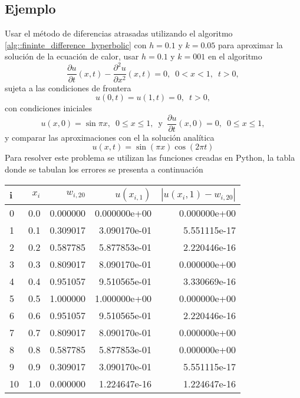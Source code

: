 \documentclass[a4paper]{article}
\begin{document}
\subsection{Ejemplo}
Usar el método de diferencias atrasadas utilizando el algoritmo \ref{alg::fininte_difference_hyperbolic} con $h=0.1$ y $k=0.05$ para aproximar la solución de la ecuación de calor, usar $h=0.1$ y $k=001$ en el algoritmo
\begin{equation}
\frac{\partial u}{\partial t}(x,t) -\frac{\partial^2 u}{\partial x ^2}(x,t)=0, \,\,\, 0<x<1,\,\,\, t>0,
\end{equation}
sujeta a las condiciones de frontera
\begin{equation*}
u(0,t)=u(1,t)=0,\,\,\, t>0,
\end{equation*}
con condiciones iniciales
\begin{equation}
u(x,0)=\sin{\pi x},\,\,\, 0\leq x \leq 1,\,\,\,\text{y}\,\,\,\frac{\partial u}{\partial t}(x,0)=0,\,\,\, 0\leq x \leq 1,
\end{equation}
y comparar las aproximaciones con el la solución analítica
\begin{equation}
u(x,t)=\sin{(\pi x)}\cos{(2\pi t)}
\end{equation}
Para  resolver este problema se utilizan las funciones creadas en Python, la tabla donde se tabulan los errores se presenta a continuación\\
\begin{tabular}{lrrrr}
\toprule
i &  $x_i$ &    $w_{i,20}$ &      $u(x_{i,1})$ &  $|u(x{_i,1})-w_{i,20}|$ \\
\midrule
0  &  0.0 &  0.000000 &  0.000000e+00 &       0.000000e+00 \\
1  &  0.1 &  0.309017 &  3.090170e-01 &       5.551115e-17 \\
2  &  0.2 &  0.587785 &  5.877853e-01 &       2.220446e-16 \\
3  &  0.3 &  0.809017 &  8.090170e-01 &       0.000000e+00 \\
4  &  0.4 &  0.951057 &  9.510565e-01 &       3.330669e-16 \\
5  &  0.5 &  1.000000 &  1.000000e+00 &       0.000000e+00 \\
6  &  0.6 &  0.951057 &  9.510565e-01 &       2.220446e-16 \\
7  &  0.7 &  0.809017 &  8.090170e-01 &       0.000000e+00 \\
8  &  0.8 &  0.587785 &  5.877853e-01 &       0.000000e+00 \\
9  &  0.9 &  0.309017 &  3.090170e-01 &       5.551115e-17 \\
10 &  1.0 &  0.000000 &  1.224647e-16 &       1.224647e-16 \\
\bottomrule
\end{tabular}
\end{document}
